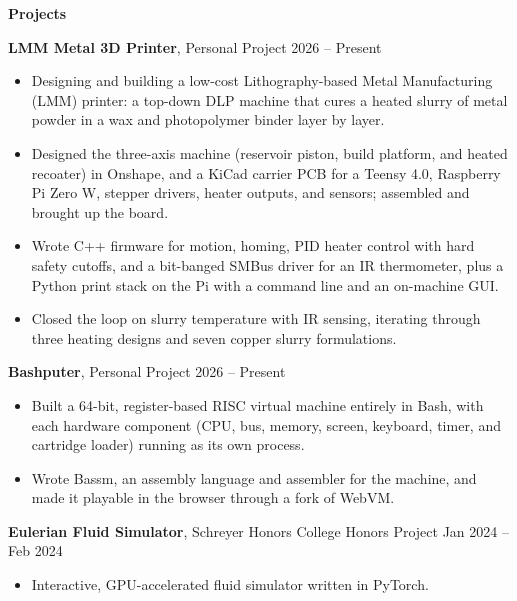 \begin{center}
    \textbf{Projects}
\end{center}
\textbf{LMM Metal 3D Printer}, Personal Project \hfill 2026 -- Present
\begin{itemize}[noitemsep, topsep=0pt, partopsep=0pt, parsep=0pt]
    \item Designing and building a low-cost Lithography-based Metal Manufacturing (LMM) printer: a top-down DLP machine that cures a heated slurry of metal powder in a wax and photopolymer binder layer by layer.

    \item Designed the three-axis machine (reservoir piston, build platform, and heated recoater) in Onshape, and a KiCad carrier PCB for a Teensy 4.0, Raspberry Pi Zero W, stepper drivers, heater outputs, and sensors; assembled and brought up the board.

    \item Wrote C++ firmware for motion, homing, PID heater control with hard safety cutoffs, and a bit-banged SMBus driver for an IR thermometer, plus a Python print stack on the Pi with a command line and an on-machine GUI.

    \item Closed the loop on slurry temperature with IR sensing, iterating through three heating designs and seven copper slurry formulations.
\end{itemize}

\vspace{12pt}

\textbf{Bashputer}, Personal Project \hfill 2026 -- Present
\begin{itemize}[noitemsep, topsep=0pt, partopsep=0pt, parsep=0pt]
    \item Built a 64-bit, register-based RISC virtual machine entirely in Bash, with each hardware component (CPU, bus, memory, screen, keyboard, timer, and cartridge loader) running as its own process.

    \item Wrote Bassm, an assembly language and assembler for the machine, and made it playable in the browser through a fork of WebVM.
\end{itemize}

\vspace{12pt}

\textbf{Eulerian Fluid Simulator}, Schreyer Honors College Honors Project \hfill Jan 2024 -- Feb 2024
\begin{itemize}[noitemsep, topsep=0pt, partopsep=0pt, parsep=0pt]
    \item Interactive, GPU-accelerated fluid simulator written in PyTorch.
\end{itemize}
